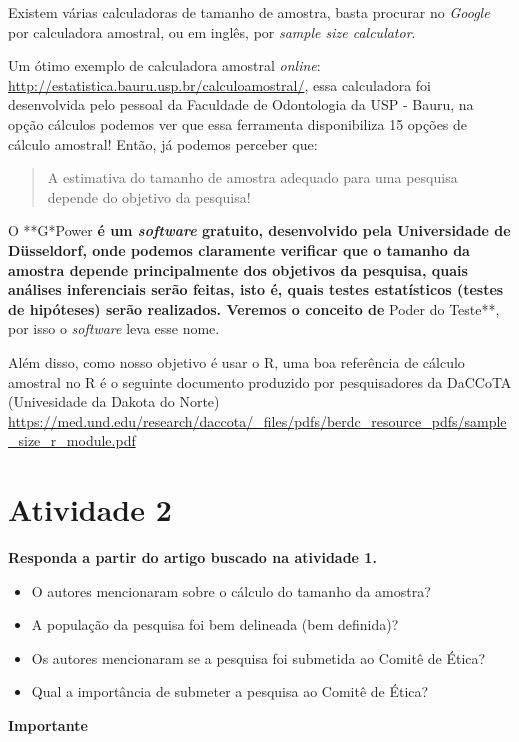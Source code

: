 \documentclass[
]{book}
\begin{document}
Existem várias calculadoras de tamanho de amostra, basta procurar no \emph{Google} por calculadora amostral, ou em inglês, por \emph{sample size calculator}.

Um ótimo exemplo de calculadora amostral \emph{online}: \url{http://estatistica.bauru.usp.br/calculoamostral/}, essa calculadora foi desenvolvida pelo pessoal da Faculdade de Odontologia da USP - Bauru, na opção cálculos podemos ver que essa ferramenta disponibiliza 15 opções de cálculo amostral! Então, já podemos perceber que:

\begin{quote}
A estimativa do tamanho de amostra adequado para uma pesquisa depende do objetivo da pesquisa!
\end{quote}

O **G*Power\textbf{ é um \emph{software} gratuito, desenvolvido pela Universidade de Düsseldorf, onde podemos claramente verificar que o tamanho da amostra depende principalmente dos objetivos da pesquisa, quais análises inferenciais serão feitas, isto é, quais testes estatísticos (testes de hipóteses) serão realizados. Veremos o conceito de }Poder do Teste**, por isso o \emph{software} leva esse nome.

Além disso, como nosso objetivo é usar o R, uma boa referência de cálculo amostral no R é o seguinte documento produzido por pesquisadores da DaCCoTA (Univesidade da Dakota do Norte) \url{https://med.und.edu/research/daccota/_files/pdfs/berdc_resource_pdfs/sample_size_r_module.pdf}

\hypertarget{atividade-2}{%
\section{Atividade 2}\label{atividade-2}}

\textbf{Responda a partir do artigo buscado na atividade 1.}

\begin{itemize}
\item
  O autores mencionaram sobre o cálculo do tamanho da amostra?
\item
  A população da pesquisa foi bem delineada (bem definida)?
\item
  Os autores mencionaram se a pesquisa foi submetida ao Comitê de Ética?
\item
  Qual a importância de submeter a pesquisa ao Comitê de Ética?
\end{itemize}

\textbf{Importante}
\end{document}
